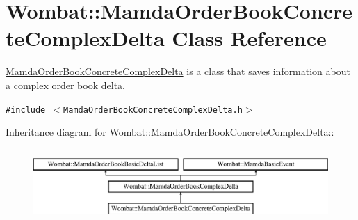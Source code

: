 \hypertarget{classWombat_1_1MamdaOrderBookConcreteComplexDelta}{
\section{Wombat::Mamda\-Order\-Book\-Concrete\-Complex\-Delta Class Reference}
\label{classWombat_1_1MamdaOrderBookConcreteComplexDelta}
}
\hyperlink{classWombat_1_1MamdaOrderBookConcreteComplexDelta}{Mamda\-Order\-Book\-Concrete\-Complex\-Delta} is a class that saves information about a complex order book delta.  


{\tt \#include $<$Mamda\-Order\-Book\-Concrete\-Complex\-Delta.h$>$}

Inheritance diagram for Wombat::Mamda\-Order\-Book\-Concrete\-Complex\-Delta::\begin{figure}[H]
\begin{center}
\leavevmode
\includegraphics[height=2.78146cm]{classWombat_1_1MamdaOrderBookConcreteComplexDelta}
\end{center}
\end{figure}
